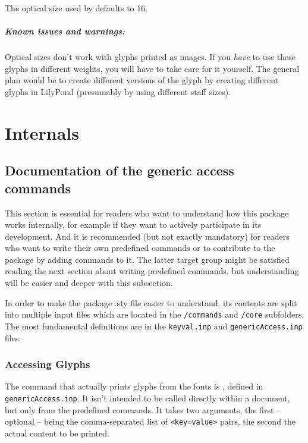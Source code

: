 \documentclass{OLLbook}
\begin{document}
The optical size used by \lilyglyphs defaults to 16.

\paragraph*{Known issues and warnings:}
Optical sizes don't work with glyphs printed as images.
If you \emph{have} to use these glyphs in different weights, you will have to take care for it yourself.
The general plan would be to create different versions of the glyph by creating different glyphs in LilyPond (presumably by using different staff sizes).

\chapter{Internals}
\label{chap:internals}

\section{Documentation of the generic access commands}
\label{sec:internals_generic_access}
This section is essential for readers who want to understand how this package works internally, for example if they want to actively participate in its development.
And it is recommended (but not exactly mandatory) for readers who want to write their own predefined commands or to contribute to the package by adding commands to it. 
The latter target group might be satisfied reading the next section about writing predefined commands, but understanding will be easier and deeper with this subsection.

\medskip
In order to make the package .sty file easier to understand, its contents are split into multiple input files which are located in the \texttt{/commands} and \texttt{/core} subfolders.
The most fundamental definitions are in the \texttt{keyval.inp} and \texttt{genericAccess.inp} files.

\subsection{Accessing \emmentaler Glyphs}
\label{subsec:accessing_emmentaler_glyphs}
The command that actually prints glyphs from the \emmentaler fonts is , defined in \texttt{genericAccess.inp}.
It isn't intended to be called directly within a document, but only from the predefined commands.
It takes two arguments, the first -- optional -- being the comma-separated list of \texttt{<key=value>} pairs, the second the actual content to be printed.
\end{document}
